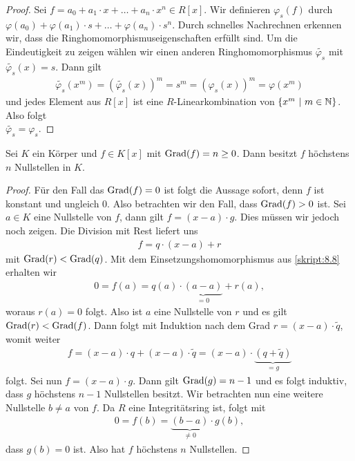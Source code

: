 \begin{proof}
	Sei $ f = a_0 +a_1 \cdot x + \dots + a_n \cdot x^n \in R[x]$.
	Wir definieren $ \varphi_s(f) $ durch \\
	$ \varphi(a_0) + \varphi(a_1) \cdot s + \dots + \varphi(a_n) \cdot s^n $.
	Durch schnelles Nachrechnen erkennen wir, dass die Ringhomomorphismuseigenschaften erfüllt sind.
	Um die Eindeutigkeit zu zeigen wählen wir einen anderen Ringhomomorphismus $ \tilde{\varphi_s} $
	mit $ \tilde{\varphi_s}(x) = s $.
	Dann gilt
	\begin{align*}
	\tilde{\varphi_s}(x^m) = (\tilde{\varphi_s}(x))^m = s^m = (\varphi_s(x))^m = \varphi(x^m)
	\end{align*}
	und jedes Element aus $ R[x] $ ist eine $ R $-Linearkombination von
	$ \lbrace x^m \ | \ m \in \mathbb{N} \rbrace$. 
	Also folgt\\
	$ \tilde{\varphi_s} = \varphi_s $.
\end{proof}

\begin{lemma} \label{skript:8.9}
	Sei $ K $ ein Körper und $ f \in K[x] $ mit $ \operatorname{Grad} (f) = n \geq 0 $.
	Dann besitzt $ f $ höchstens $ n $ Nullstellen in $ K $.
\end{lemma}

\begin{proof}
	Für den Fall das $ \operatorname{Grad}(f) = 0 $ ist folgt die Aussage sofort, denn $ f $ ist konstant und ungleich $ 0 $.
	Also betrachten wir den Fall, dass $ \operatorname{Grad}(f) > 0 $ ist.
	Sei $ a \in K  $ eine Nullstelle von $ f $, dann gilt $ f = (x-a) \cdot g $.
	Dies müssen wir jedoch noch zeigen.
	Die Division mit Rest liefert uns 
	\begin{align*}
	f = q \cdot (x-a) + r
	\end{align*}
	mit $ \operatorname{Grad}(r) < \operatorname{Grad}(q) $. Mit dem Einsetzungshomomorphismus aus \ref{skript:8.8} erhalten wir
	\begin{align*}
	0 = f(a) = q(a) \cdot \underbrace{(a-a)}_{=0} + r(a),
	\end{align*}
	woraus $ r(a) = 0 $ folgt.
	Also ist $ a $ eine Nullstelle von $ r $ und es gilt $ \operatorname{Grad}(r) < \operatorname{Grad}(f) $.
	Dann folgt mit Induktion nach dem Grad $ r = (x-a) \cdot \tilde{q} $, womit weiter
	\begin{align*}
	f = (x-a)  \cdot q + (x-a) \cdot \tilde{q}
	= (x-a) \cdot \underbrace{(q + \tilde{q})}_{=g}
	\end{align*}
	folgt.
	Sei nun $ f = (x-a) \cdot g $.
	Dann gilt $ \operatorname{Grad}(g) = n -1  $ und es folgt induktiv, dass $ g $ höchstens $ n-1 $ Nullstellen besitzt.
	Wir betrachten nun eine weitere Nullstelle $ b \neq a $ von $ f $.
	Da $ R $ eine Integritätsring ist, folgt mit
	\begin{align*}
	0 = f(b) = \underbrace{(b-a)}_{\neq 0} \cdot g(b),
	\end{align*}
	dass $ g(b) = 0 $ ist.
	Also hat $ f $ höchstens $ n $ Nullstellen.
\end{proof} 

